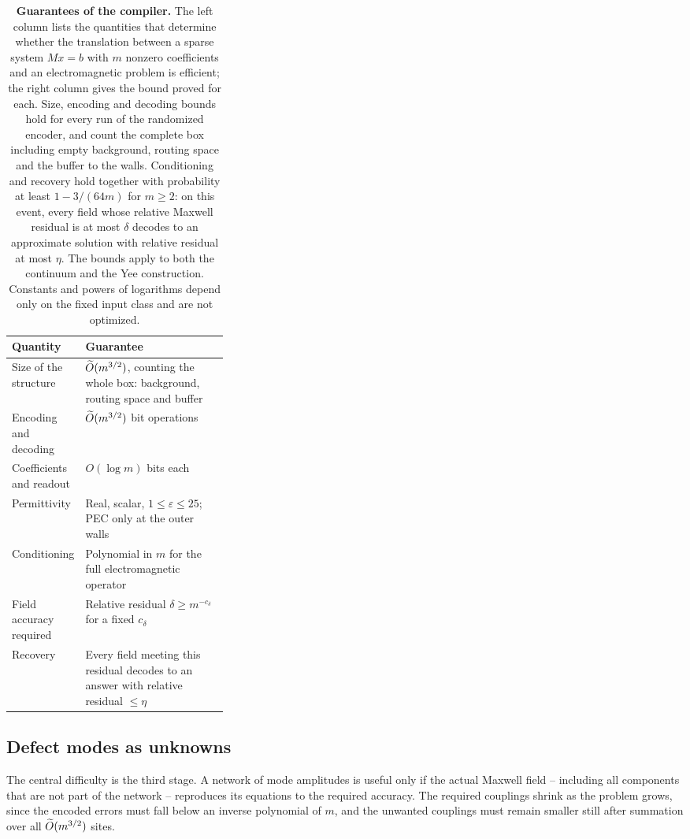 \begin{table}[tbp]
\centering
\caption{\textbf{Guarantees of the compiler.} The left column lists the
quantities that determine whether the translation between a sparse system
$Mx=b$ with $m$ nonzero coefficients and an electromagnetic problem is
efficient; the right column gives the bound proved for each. Size, encoding
and decoding bounds hold for every run of the randomized encoder, and count
the complete box including empty background, routing space and the buffer to
the walls. Conditioning and recovery hold together with probability at least
$1-3/(64m)$ for $m\ge2$: on this event, every field whose relative Maxwell
residual is at most $\delta$ decodes to an approximate solution with relative
residual at most $\eta$. The bounds apply to both the continuum and the Yee
construction. Constants and powers of logarithms depend only on the fixed
input class and are not optimized.}
\label{tab:guarantees}
\small
\begin{tabularx}{\linewidth}{@{}p{0.32\linewidth}X@{}}
\toprule
Quantity & Guarantee \\
\midrule
Size of the structure & $\widetilde O(m^{3/2})$, counting the whole box: background, routing space and buffer \\
Encoding and decoding & $\widetilde O(m^{3/2})$ bit operations \\
Coefficients and readout & $O(\log m)$ bits each \\
Permittivity & Real, scalar, $1\le\varepsilon\le25$; PEC only at the outer walls \\
Conditioning & Polynomial in $m$ for the full electromagnetic operator \\
Field accuracy required & Relative residual $\delta\ge m^{-c_\delta}$ for a fixed $c_\delta$ \\
Recovery & Every field meeting this residual decodes to an answer with relative residual $\le\eta$ \\
\bottomrule
\end{tabularx}
\end{table}

\subsection{Defect modes as unknowns}

The central difficulty is the third stage. A network of mode amplitudes is
useful only if the actual Maxwell field -- including all components that are
not part of the network -- reproduces its equations to the required accuracy.
The required couplings shrink as the problem grows, since the encoded errors
must fall below an inverse polynomial of $m$, and the unwanted couplings must
remain smaller still after summation over all $\widetilde O(m^{3/2})$ sites.

